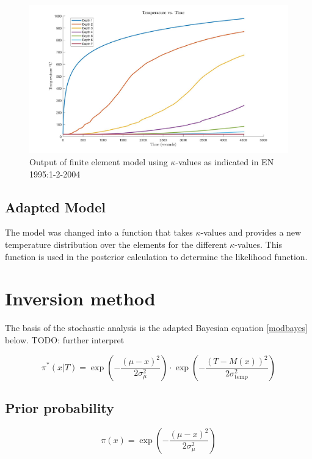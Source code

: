 \begin{figure}[H]
	\label{og_modeldata}
	\centering
	\includegraphics[width=\linewidth,]{figures/originalmugraph.jpg}
	\caption{Output of finite element model using $\kappa$-values as indicated in EN 1995:1-2-2004}
\end{figure}	

	\subsection{Adapted Model}	
	The model was changed into a function that takes $\kappa$-values and provides a new temperature distribution over the elements for the different $\kappa$-values. 
	This function is used in the posterior calculation to determine the likelihood function.
	

\section{Inversion method}
The basis of the stochastic analysis is the adapted Bayesian equation \ref{modbayes} below. 
TODO: further interpret

\begin{equation}
\label{modbayes}
\pi^* (x|T) = \exp\left(-\frac{(\mu - x)^2}{2\sigma_{\mu}^2}\right) \cdot \exp\left(-\frac{\left(T-M(x)\right)^2}{2\sigma_{\text{temp}}^2}\right)
\end{equation}

	\subsection{Prior probability}
	
	\begin{equation}
	\label{prior}
	\pi(x) = \exp\left(-\frac{(\mu - x)^2}{2\sigma_{\mu}^2}\right)
	\end{equation}

